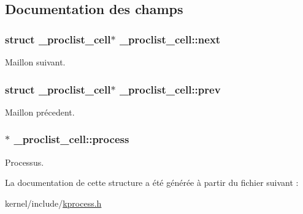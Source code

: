 \subsection{Documentation des champs}
\hypertarget{struct__proclist__cell_a76062c3c8bce7b458ed610e7568c0858}{
\subsubsection[{next}]{\setlength{\rightskip}{0pt plus 5cm}struct {\bf \-\_\-proclist\-\_\-cell}$\ast$ \-\_\-proclist\-\_\-cell\-::next}}\label{struct__proclist__cell_a76062c3c8bce7b458ed610e7568c0858}
Maillon suivant. \hypertarget{struct__proclist__cell_aee5c3bd7595d05c693fe6df63937052e}{
\subsubsection[{prev}]{\setlength{\rightskip}{0pt plus 5cm}struct {\bf \-\_\-proclist\-\_\-cell}$\ast$ \-\_\-proclist\-\_\-cell\-::prev}}\label{struct__proclist__cell_aee5c3bd7595d05c693fe6df63937052e}
Maillon précedent. \hypertarget{struct__proclist__cell_abe320ebc4ea6556f17dd28e93efb6b31}{
\subsubsection[{process}]{$\ast$ \-\_\-proclist\-\_\-cell\-::process}}\label{struct__proclist__cell_abe320ebc4ea6556f17dd28e93efb6b31}
Processus. 

La documentation de cette structure a été générée à partir du fichier suivant \-:\begin{DoxyCompactItemize}
\item 
kernel/include/\hyperlink{kprocess_8h}{kprocess.\-h}\end{DoxyCompactItemize}
